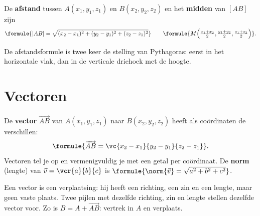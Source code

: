 \begin{oefeningen}
\end{oefeningen}

\begin{theorie}
De \textbf{\textcolor{accent}{afstand}} tussen $A(x_1, y_1, z_1)$ en $B(x_2, y_2, z_2)$ en het \textbf{\textcolor{accent}{midden}} van $[AB]$ zijn
\[\formule{|AB| = \sqrt{(x_2 - x_1)^2 + (y_2 - y_1)^2 + (z_2 - z_1)^2}} \qquad \formule{M\Bigl(\tfrac{x_1 + x_2}{2}, \tfrac{y_1 + y_2}{2}, \tfrac{z_1 + z_2}{2}\Bigr)}.\]
\end{theorie}

De afstandsformule is twee keer de stelling van Pythagoras: eerst in het horizontale vlak, dan in de verticale driehoek met de hoogte.


\begin{oefeningen}

\end{oefeningen}

\section{Vectoren}

\begin{theorie}
De \textbf{\textcolor{accent}{vector}} $\overrightarrow{AB}$ van $A(x_1, y_1, z_1)$ naar $B(x_2, y_2, z_2)$ heeft als coördinaten de verschillen:
\[\formule{\overrightarrow{AB} = \vc{x_2 - x_1}{y_2 - y_1}{z_2 - z_1}}.\]
Vectoren tel je op en vermenigvuldig je met een getal per coördinaat. De \textbf{\textcolor{accent}{norm}} (lengte) van $\vec v = \vcr{a}{b}{c}$ is $\formule{\norm{\vec v} = \sqrt{a^2 + b^2 + c^2}}$.
\end{theorie}

Een vector is een verplaatsing: hij heeft een richting, een zin en een lengte, maar geen vaste plaats. Twee pijlen met dezelfde richting, zin en lengte stellen dezelfde vector voor. Zo is $B = A + \overrightarrow{AB}$: vertrek in $A$ en verplaats.

